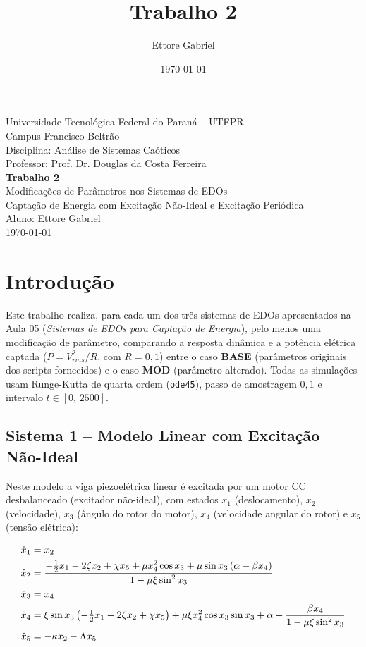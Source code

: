 \documentclass[a4paper,11pt]{article}
\title{Trabalho 2}
\author{Ettore Gabriel}
\date{\today}
\begin{document}
\begin{titlepage}
\centering
\vspace*{1cm}
{\large Universidade Tecnológica Federal do Paraná -- UTFPR}\\
{\large Campus Francisco Beltrão}\\[0.3cm]
{\large Disciplina: Análise de Sistemas Caóticos}\\
{\large Professor: Prof. Dr. Douglas da Costa Ferreira}\\[3cm]

{\Huge \textbf{Trabalho 2}}\\[0.5cm]
{\Large Modificações de Parâmetros nos Sistemas de EDOs}\\[0.3cm]
{\large Captação de Energia com Excitação Não-Ideal e Excitação Periódica}\\[3cm]

{\large Aluno: Ettore Gabriel}\\[0.3cm]
{\large \today}

\vfill
\end{titlepage}

\section{Introdução}

Este trabalho realiza, para cada um dos três sistemas de EDOs
apresentados na Aula 05 (\emph{Sistemas de EDOs para Captação de
Energia}), pelo menos uma modificação de parâmetro, comparando a
resposta dinâmica e a potência elétrica captada ($P=V_{rms}^2/R$, com
$R=0{,}1$) entre o caso \textbf{BASE} (parâmetros originais dos scripts
fornecidos) e o caso \textbf{MOD} (parâmetro alterado). Todas as
simulações usam Runge-Kutta de quarta ordem (\texttt{ode45}), passo de
amostragem $0{,}1$ e intervalo $t\in[0,\,2500]$.

\subsection{Sistema 1 -- Modelo Linear com Excitação Não-Ideal}
Neste modelo a viga piezoelétrica linear é excitada por um motor CC
desbalanceado (excitador não-ideal), com estados
$x_1$ (deslocamento), $x_2$ (velocidade), $x_3$ (ângulo do rotor do
motor), $x_4$ (velocidade angular do rotor) e $x_5$ (tensão elétrica):

\begin{align}
\dot{x}_1 &= x_2 \notag\\
\dot{x}_2 &= \frac{-\tfrac{1}{2}x_1 - 2\zeta x_2 + \chi x_5 + \mu x_4^2\cos x_3 + \mu\sin x_3\,(\alpha-\beta x_4)}{1-\mu\xi\sin^2 x_3} \notag\\
\dot{x}_3 &= x_4 \notag\\
\dot{x}_4 &= \xi\sin x_3\left(-\tfrac{1}{2}x_1 - 2\zeta x_2 + \chi x_5\right) + \mu\xi x_4^2\cos x_3\sin x_3 + \alpha - \frac{\beta x_4}{1-\mu\xi\sin^2 x_3} \notag\\
\dot{x}_5 &= -\kappa x_2 - \Lambda x_5 \notag
\end{align}
\end{document}
